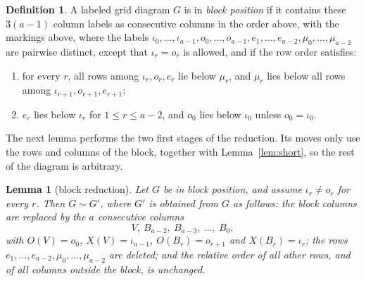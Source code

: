 \documentclass[11pt]{amsart}
\newtheorem{lemma}[theorem]{Lemma}
\theoremstyle{definition}
\newtheorem{definition}[theorem]{Definition}
\theoremstyle{remark}
\newcommand{\Mov}{\mathrel{\sim}}
\begin{document}
\begin{definition}\label{def:block-conf}
A labeled grid diagram $G$ is in \emph{block position} if it contains these $3(a-1)$ column labels as
consecutive columns in the order above, with the markings above, where the labels
$\iota_0,\dots,\iota_{a-1},o_0,\dots,o_{a-1},e_1,\dots,e_{a-2},\mu_0,\dots,\mu_{a-2}$ are pairwise
distinct, except that $\iota_r=o_r$ is allowed, and if the row order satisfies:
\begin{enumerate}
\item[(B1)] for every $r$, all rows among $\iota_r,o_r,e_r$ lie below $\mu_r$, and $\mu_r$ lies below
all rows among $\iota_{r+1},o_{r+1},e_{r+1}$;
\item[(B2)] $e_r$ lies below $\iota_r$ for $1\le r\le a-2$, and $o_0$ lies below $\iota_0$ unless
$o_0=\iota_0$.
\end{enumerate}
\end{definition}

The next lemma performs the two first stages of the reduction. Its moves only use the rows and
columns of the block, together with Lemma~\ref{lem:short}, so the rest of the diagram is arbitrary.

\begin{lemma}[block reduction]\label{lem:block}
Let $G$ be in block position, and assume $\iota_r\ne o_r$ for every $r$. Then $G\Mov G'$, where
$G'$ is obtained from $G$ as follows: the block columns are replaced by the $a$ consecutive columns
\[
V,\ B_{a-2},\ B_{a-3},\ \dots,\ B_0,
\]
with $O(V)=o_0$, $X(V)=\iota_{a-1}$, $O(B_r)=o_{r+1}$ and $X(B_r)=\iota_r$; the rows
$e_1,\dots,e_{a-2},\mu_0,\dots,\mu_{a-2}$ are deleted; and the relative order of all other rows,
and of all columns outside the block, is unchanged.
\end{lemma}
\end{document}
